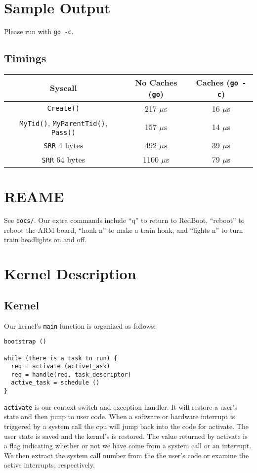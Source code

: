 \documentclass{article}
\begin{document}
\section{Sample Output}
Please run with \texttt{go -c}.

\subsection{Timings}
\begin{tabular}{|c|c|c|}
\hline
Syscall & No Caches (\texttt{go}) & Caches (\texttt{go -c}) \\
\hline
\hline
\texttt{Create()} & 217 $\mu$s & 16 $\mu$s \\
\hline
\texttt{MyTid()}, \texttt{MyParentTid()}, \texttt{Pass()} & 157 $\mu$s & 14 $\mu$s \\
\hline
\texttt{SRR} 4 bytes & 492 $\mu$s & 39 $\mu$s \\
\hline
\texttt{SRR} 64 bytes & 1100 $\mu$s & 79 $\mu$s \\
\hline
\end{tabular}

\section{REAME}
See \texttt{docs/}. Our extra commands include ``q'' to return to RedBoot,
``reboot'' to reboot the ARM board, ``honk n'' to make a train honk, and
``lights n'' to turn train headlights on and off.

\section{Kernel Description}

\subsection{Kernel}
Our kernel's \texttt{main} function is organized as follows:
\begin{verbatim}
bootstrap () 

while (there is a task to run) { 
  req = activate (activet_ask) 
  req = handle(req, task_descriptor) 
  active_task = schedule () 
} 
\end{verbatim}
\texttt{activate} is our context switch and exception handler. It will restore a
user's state and then jump to user code. When a software or hardware interrupt is
triggered by a system call the cpu will jump back into the code for activate.
The user state is saved and the kernel's is restored. The value returned by
activate is a flag indicating whether or not we have come from a system call or
an interrupt. We then extract the system call number from the the user's code or
examine the active interrupts, respectively.
\end{document}
